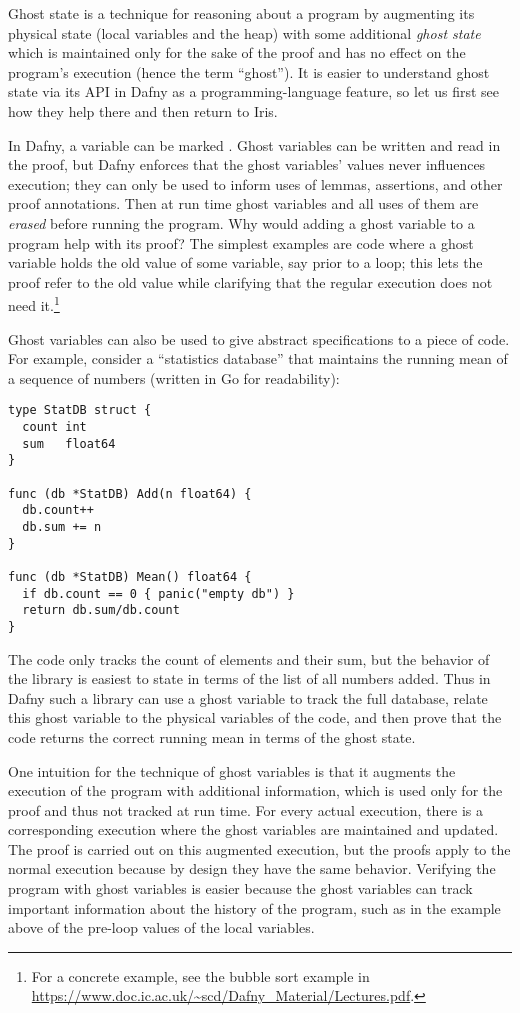 Ghost state is a technique for reasoning about a program by augmenting its
physical state (local variables and the heap) with some additional \emph{ghost
state} which is maintained only for the sake of the proof and has no effect on
the program's execution (hence the term ``ghost''). It is easier to understand
ghost state via its API in Dafny as a programming-language feature, so let
us first see how they help there and then return to Iris.

In Dafny, a variable can be marked . Ghost variables can be written
and read in the proof, but Dafny enforces that the ghost variables' values never
influences execution; they can only be used to inform uses of lemmas,
assertions, and other proof annotations. Then at run time ghost variables and all
uses of them are \emph{erased} before running the program. Why would adding a
ghost variable to a program help with its proof? The simplest examples are code
where a ghost variable holds the old value of some variable, say prior to a
loop; this lets the proof refer to the old value while clarifying that the
regular execution does not need it.\footnote{For a concrete example, see the
bubble sort example in
\url{https://www.doc.ic.ac.uk/~scd/Dafny_Material/Lectures.pdf}.}

Ghost variables can also be used to give abstract specifications to a piece of
code. For example, consider a ``statistics database'' that maintains the running
mean of a sequence of numbers (written in Go for readability):
%
\begin{verbatim}
type StatDB struct {
  count int
  sum   float64
}

func (db *StatDB) Add(n float64) {
  db.count++
  db.sum += n
}

func (db *StatDB) Mean() float64 {
  if db.count == 0 { panic("empty db") }
  return db.sum/db.count
}
\end{verbatim}

The code only tracks the count of elements and
their sum, but the behavior of the library is easiest to state in terms of the list of all
numbers added. Thus in Dafny such a library can use a ghost variable to track
the full database, relate this ghost variable to the physical variables
of the code, and then prove that the code returns the correct running mean in
terms of the ghost state.

One intuition for the technique of ghost variables is that it augments the
execution of the program with additional information, which is used only for the proof
and thus not tracked at run time. For every actual execution, there is a
corresponding execution where the ghost variables are maintained and updated.
The proof is carried out on this augmented execution,
but the proofs apply to the normal execution because by design they have the
same behavior. Verifying the program with ghost
variables is easier because the ghost variables can track important
information about the history of the program, such as in the example above of
the pre-loop values of the local variables.

